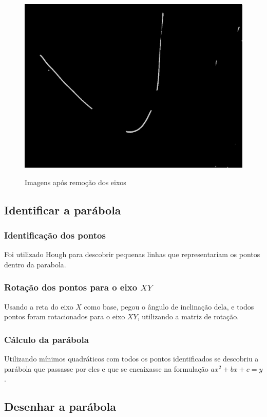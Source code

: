 \documentclass{article}
\begin{document}
\begin{figure}[h!]
        {\includegraphics[scale=0.1]{exemplo3WithoutAxis.jpg}}
    \caption{Imagens após remoção dos eixos }
    \end{figure}

\subsection{Identificar a parábola}

    \subsubsection{Identificação dos pontos}
    Foi utilizado Hough para descobrir pequenas linhas que representariam os pontos dentro da parabola.
    \subsubsection{Rotação dos pontos para o eixo \(XY\)}
    Usando a reta do eixo \(X\) como base, pegou o ângulo de inclinação dela, e todos pontos foram rotacionados para o eixo \(XY\), utilizando a matriz de rotação.
    \subsubsection{Cálculo da parábola}
    Utilizando mínimos quadráticos com todos os pontos identificados se descobriu a parábola que passasse por eles e que se encaixasse na formulação \(ax^2 + bx + c = y\).

\subsection{Desenhar a parábola}
\end{document}
